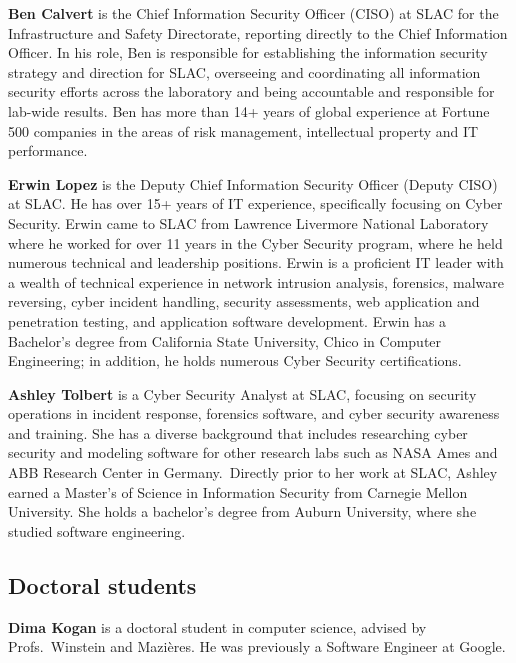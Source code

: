 \documentclass[11pt]{article}
\newcommand{\slim}{\vspace{\baselineskip}}
\begin{document}
\noindent \textbf{Ben Calvert} is the Chief Information Security
Officer (CISO) at SLAC for the Infrastructure and Safety Directorate,
reporting directly to the Chief Information Officer. In his role, Ben
is responsible for establishing the information security strategy and
direction for SLAC, overseeing and coordinating all information
security efforts across the laboratory and being accountable and
responsible for lab-wide results. Ben has more than 14+ years of
global experience at Fortune 500 companies in the areas of risk
management, intellectual property and IT performance.

\slim

\noindent \textbf{Erwin Lopez} is the Deputy Chief Information
Security Officer (Deputy CISO) at SLAC. He has over 15+ years of IT
experience, specifically focusing on Cyber Security. Erwin came to
SLAC from Lawrence Livermore National Laboratory where he worked for
over 11 years in the Cyber Security program, where he held numerous
technical and leadership positions. Erwin is a proficient IT leader
with a wealth of technical experience in network intrusion analysis,
forensics, malware reversing, cyber incident handling, security
assessments, web application and penetration testing, and application
software development. Erwin has a Bachelor's degree from California
State University, Chico in Computer Engineering; in addition, he holds
numerous Cyber Security certifications.

\slim

\noindent \textbf{Ashley Tolbert} is a Cyber Security Analyst at SLAC,
focusing on security operations in incident response, forensics
software, and cyber security awareness and training. She has a diverse
background that includes researching cyber security and modeling
software for other research labs such as NASA Ames and ABB Research
Center in Germany. Directly prior to her work at SLAC, Ashley earned a
Master's of Science in Information Security from Carnegie Mellon
University. She holds a bachelor’s degree from Auburn University,
where she studied software engineering.  \slim

\subsection{Doctoral students}

\noindent \textbf{Dima Kogan} is a doctoral student in computer science,
advised by Profs.~Winstein and Mazi\`{e}res. He was previously a Software
Engineer at Google.
\end{document}
